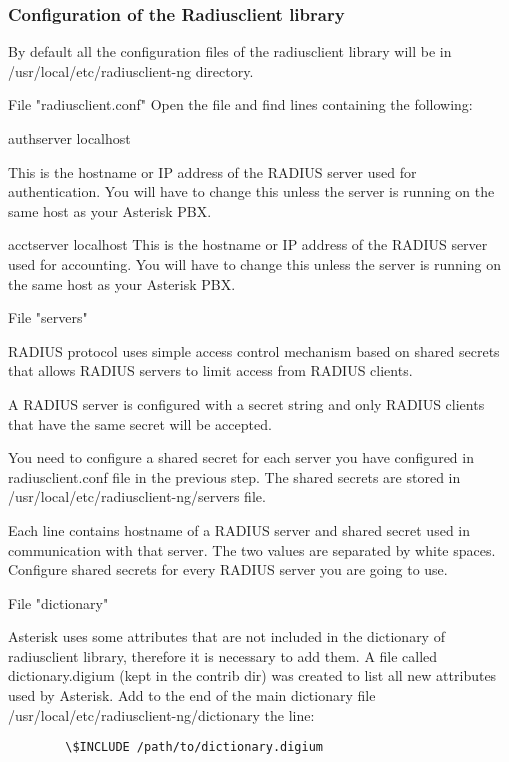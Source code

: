 \subsubsection{Configuration of the Radiusclient library}
	
	By default all the configuration files of the radiusclient library will
	be in /usr/local/etc/radiusclient-ng directory.
		
	File "radiusclient.conf"
		Open the file and find lines containing the following:

			authserver      localhost
	
	This is the hostname or IP address of the RADIUS server used for 
	authentication. You will have to change this unless the server is 
	running on the same host as your Asterisk PBX.

			acctserver      localhost
	This is the hostname or IP address of the RADIUS server used for 
	accounting. You will have to change this unless the server is running
	on the same host as your Asterisk PBX.

	File "servers" 
		
	RADIUS protocol uses simple access control mechanism based on shared
	secrets that allows RADIUS servers to limit access from RADIUS clients.
		
	A RADIUS server is configured with a secret string and only RADIUS 
	clients that have the same secret will be accepted.

	You need to configure a shared secret for each server you have 
	configured in radiusclient.conf file in the previous step. The shared 
	secrets are stored in /usr/local/etc/radiusclient-ng/servers file.

	Each line contains hostname of a RADIUS server and shared secret 
	used in communication with that server. The two values are separated 
	by white spaces. Configure shared secrets for every RADIUS server you 
	are going to use.

	File "dictionary"
			
	Asterisk uses some attributes that are not included in the 
	dictionary of radiusclient library, therefore it is necessary to add 
	them. A file called dictionary.digium (kept in the contrib dir)
	was created to list all new attributes used by Asterisk. 
	Add to the end of the main dictionary file
	/usr/local/etc/radiusclient-ng/dictionary
	the line:
\begin{verbatim}
		\$INCLUDE /path/to/dictionary.digium
\end{verbatim}

